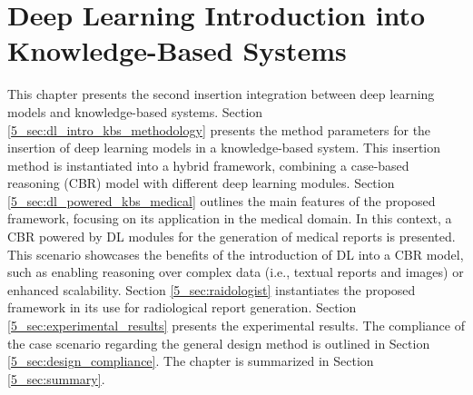 \chapter{Deep Learning Introduction into Knowledge-Based Systems}
\label{chap:dlintegrationkbs} 

This chapter presents the second insertion integration between deep learning models and knowledge-based systems. Section \ref{5_sec:dl_intro_kbs_methodology} presents the method parameters for the insertion of deep learning models in a knowledge-based system. This insertion method is instantiated into a hybrid framework, combining a case-based reasoning (CBR) model with different deep learning modules. Section \ref{5_sec:dl_powered_kbs_medical} outlines the main features of the proposed framework, focusing on its application in the medical domain. In this context, a CBR powered by DL modules for the generation of medical reports is presented. This scenario showcases the benefits of the introduction of DL into a CBR model, such as enabling reasoning over complex data (i.e., textual reports and images) or enhanced scalability. Section \ref{5_sec:raidologist} instantiates the proposed framework in its use for radiological report generation. Section \ref{5_sec:experimental_results} presents the experimental results. The compliance of the case scenario regarding the general design method is outlined in Section \ref{5_sec:design_compliance}. The chapter is summarized in Section \ref{5_sec:summary}. 


